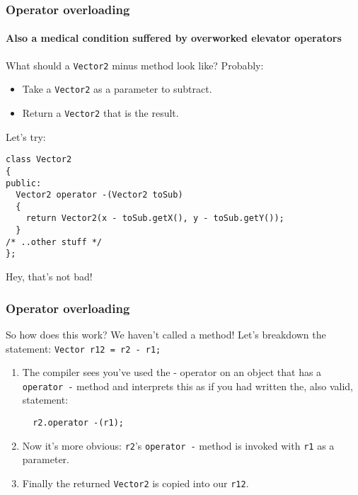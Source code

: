\documentclass{beamer}
\begin{document}
\begin{frame}[fragile]
  \frametitle{Operator overloading}
  \framesubtitle{Also a medical condition suffered by overworked elevator operators}
  
  What should a \texttt{Vector2} minus method look like?  Probably:
  \begin{itemize}
    \item{Take a \texttt{Vector2} as a parameter to subtract.}
    \pause
    \item{Return a \texttt{Vector2} that is the result.}
  \end{itemize}
  \pause
  Let's try:
  \begin{lstlisting}
class Vector2
{
public:
  Vector2 operator -(Vector2 toSub)
  {
    return Vector2(x - toSub.getX(), y - toSub.getY());
  } 
/* ..other stuff */
};
  \end{lstlisting}
  Hey, that's not bad!
  
\end{frame}

\begin{frame}[fragile]
  \frametitle{Operator overloading}
  
  So how does this work?  We haven't called a method!  Let's breakdown the statement: \texttt{Vector r12 = r2 - r1;}\pause
  \begin{enumerate}
    \item{The compiler sees you've used the - operator on an object that has a \texttt{operator -} method and interprets this as if you had written the, also valid, statement:
    \begin{lstlisting}
  r2.operator -(r1);
    \end{lstlisting}}
    \pause
    \item{Now it's more obvious: \texttt{r2}'s \texttt{operator -} method is invoked with \texttt{r1} as a parameter.}
    \pause
    \item{Finally the returned \texttt{Vector2} is copied into our \texttt{r12}.}
  \end{enumerate}

\end{frame}
\end{document}
